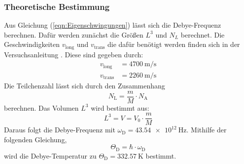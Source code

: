 \subsubsection{Theoretische Bestimmung}
Aus Gleichung (\ref{eqn:Eigenschwingungen}) lässt sich die Debye-Frequenz berechnen.
Dafür werden zunächst die Größen $L^3$ und $N_L$ berechnet.
Die Geschwindigkeiten $v_\mathrm{long}$ und $v_\mathrm{trans}$ die dafür benötigt werden finden sich in der Versuchsanleitung \cite{Anleitung}. Diese sind gegeben durch:
\begin{align*}
  v_\mathrm{long} &= \SI{4700}{\meter\per\second} \\
  v_\mathrm{trans} &= \SI{2260}{\meter\per\second}
\end{align*}
Die Teilchenzahl lässt sich durch den Zusammenhang
\begin{equation}
  N_\mathrm{L} = \dfrac{m}{M} \cdot N_\mathrm{A}
\end{equation}
berechnen.
Das Volumen $L^3$ wird bestimmt aus:
\begin{equation}
  L^3 = V = V_0 \cdot \frac{m}{M}
\end{equation}
Daraus folgt die Debye-Frequenz mit $\omega_\mathrm{D} = \SI{43.54e12}{\hertz}$.
Mithilfe der folgenden Gleichung,
\begin{equation}
  \Theta_\mathrm{D} =\hbar\cdot\omega_\mathrm{D}
\end{equation}
wird die Debye-Temperatur zu $\Theta_\mathrm{D} = \SI{332.57}{\kelvin}$ bestimmt.
